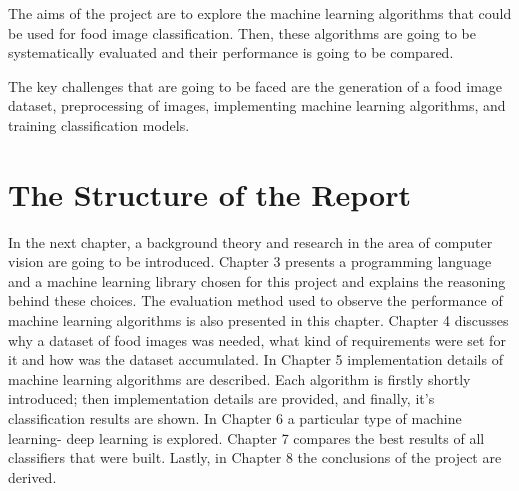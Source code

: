 The aims of the project are to explore the machine learning algorithms that could be used for food image classification.
Then, these algorithms are going to be systematically evaluated and their performance is going to be compared.

The key challenges that are going to be faced are the generation of a food image dataset, preprocessing of images, implementing machine learning algorithms, and training classification models.

\section{The Structure of the Report}
In the next chapter, a background theory and research in the area of computer vision are going to be introduced. Chapter 3 presents a programming language and a  machine learning library chosen for this project and explains the reasoning behind these choices. The evaluation method used to observe the performance of machine learning algorithms is also presented in this chapter. Chapter 4 discusses why a dataset of food images was needed, what kind of requirements were set for it and how was the dataset accumulated. In Chapter 5 implementation details of machine learning algorithms are described. Each algorithm is firstly shortly introduced; then implementation details are provided, and finally, it's classification results are shown.  In Chapter 6 a particular type of machine learning- deep learning is explored. Chapter 7 compares the best results of all classifiers that were built. Lastly, in Chapter 8 the conclusions of the project are derived.